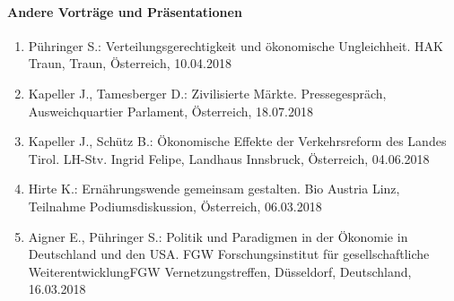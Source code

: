\paragraph{Andere Vorträge und Präsentationen}
\begin{enumerate}
	\item Pühringer S.: Verteilungsgerechtigkeit und ökonomische Ungleichheit. HAK Traun, Traun, Österreich, 10.04.2018
	\item Kapeller J., Tamesberger D.: Zivilisierte Märkte. Pressegespräch, Ausweichquartier Parlament, Österreich, 18.07.2018
	\item Kapeller J., Schütz B.: Ökonomische Effekte der Verkehrsreform des Landes Tirol. LH-Stv. Ingrid Felipe, Landhaus Innsbruck, Österreich, 04.06.2018
	\item Hirte K.: Ernährungswende gemeinsam gestalten. Bio Austria Linz, Teilnahme Podiumsdiskussion, Österreich, 06.03.2018
	\item Aigner E., Pühringer S.: Politik und Paradigmen in der Ökonomie in Deutschland und den USA. FGW Forschungsinstitut für gesellschaftliche WeiterentwicklungFGW Vernetzungstreffen, Düsseldorf, Deutschland, 16.03.2018
\end{enumerate}
